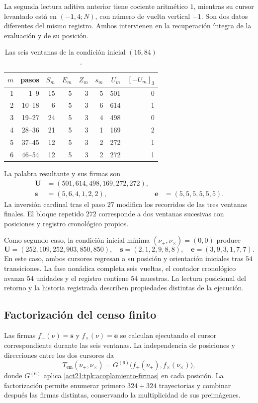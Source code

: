 La segunda lectura aditiva anterior tiene cociente aritmético \(1\),
mientras su cursor levantado está en \((-1,4;N)\), con número de vuelta
vertical \(-1\). Son dos datos diferentes del mismo registro. Ambos
intervienen en la recuperación íntegra de la evaluación y de su posición.

\begin{table}[htbp]
\caption{Las seis ventanas de la condición inicial \((16,84)\).}
\label{act21:tpk:tabla-seis501}
\begin{tabular}{@{}rrrrrrrr@{}}
\toprule
\(m\)&pasos&\(S_m\)&\(E_m\)&\(Z_m\)&\(s_m\)&\(U_m\)&\([-U_m]_3\)\\
\midrule
1&1--9&15&5&3&5&501&0\\
2&10--18&6&5&3&6&614&1\\
3&19--27&24&5&3&4&498&0\\
4&28--36&21&5&3&1&169&2\\
5&37--45&12&5&3&2&272&1\\
6&46--54&12&5&3&2&272&1\\
\bottomrule
\end{tabular}
\end{table}

La palabra resultante y sus firmas son
\begin{align*}
 \mathbf U&=(501,614,498,169,272,272),\\
 \mathbf s&=(5,6,4,1,2,2),&
 \mathbf e&=(5,5,5,5,5,5).
\end{align*}
La inversión cardinal tras el paso \(27\) modifica los recorridos de las
tres ventanas finales. El bloque repetido \(272\) corresponde a dos
ventanas sucesivas con posiciones y registro cronológico propios.

Como segundo caso, la condición inicial mínima \((\nu_+,\nu_\times)=(0,0)\)
produce
\[
 \mathbf U=(252,109,252,903,850,850),\quad
 \mathbf s=(2,1,2,9,8,8),\quad
 \mathbf e=(3,9,3,1,7,7).
\]
En este caso, ambos cursores regresan a su posición y orientación iniciales
tras \(54\) transiciones. La fase nonádica completa seis vueltas, el
contador cronológico avanza \(54\) unidades y el registro contiene
\(54\) muestras. La lectura posicional del retorno y
la historia registrada describen propiedades distintas de la ejecución.

\subsection{Factorización del censo finito}
\label{act21:tpk:censo}

Las firmas \(f_+(\nu)=\mathbf s\) y \(f_\times(\nu)=\mathbf e\) se
calculan ejecutando el cursor correspondiente durante las seis ventanas.
La independencia de posiciones y direcciones entre los dos cursores da
\begin{equation}
 T_{\mathrm{em}}(\nu_+,\nu_\times)
   =G^{(6)}\bigl(f_+(\nu_+),f_\times(\nu_\times)\bigr),
 \label{act21:tpk:factorizacion}
\end{equation}
donde \(G^{(6)}\) aplica \eqref{act21:tpk:acoplamiento-firmas} en cada posición.
La factorización permite enumerar primero \(324+324\) trayectorias y
combinar después las firmas distintas, conservando la multiplicidad de
sus preimágenes.

